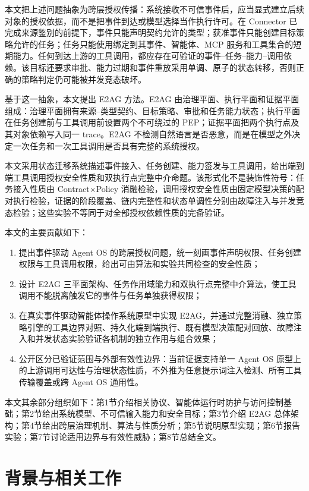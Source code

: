 本文把上述问题抽象为跨层授权传播：系统接收不可信事件后，应当显式建立后续对象的授权依据，而不是把事件到达或模型选择当作执行许可。在 Connector 已完成来源鉴别的前提下，事件只能声明契约允许的类型；获准事件只能创建目标策略允许的任务；任务只能使用绑定到其事件、智能体、MCP 服务和工具集合的短期能力。任何到达上游的工具调用，都应存在可验证的事件--任务--能力--调用依赖。该目标还要求审批、能力过期和事件重放采用单调、原子的状态转移，否则正确的策略判定仍可能被并发竞态破坏。

基于这一抽象，本文提出 E2AG 方法。E2AG 由治理平面、执行平面和证据平面组成：治理平面拥有来源--类型契约、目标策略、审批和任务能力状态；执行平面在任务创建前与工具调用前设置两个不可绕过的 PEP；证据平面把两个执行点及其对象依赖写入同一 trace。E2AG 不检测自然语言是否恶意，而是在模型之外决定一次任务和一次工具调用是否具有完整的系统授权。

本文采用状态迁移系统描述事件接入、任务创建、能力签发与工具调用，给出端到端工具调用授权安全性质和双执行点完整中介命题。该形式化不是装饰性符号：任务接入性质由 Contract$\times$Policy 消融检验，调用授权安全性质由固定模型决策的配对执行检验，证据的阶段覆盖、链内完整性和状态单调性分别由故障注入与并发竞态检验；这些实验不等同于对全部授权依赖性质的完备验证。

本文的主要贡献如下：
\begin{enumerate}
  \item 提出事件驱动 Agent OS 的跨层授权问题，统一刻画事件声明权限、任务创建权限与工具调用权限，给出可由算法和实验共同检查的安全性质；
  \item 设计 E2AG 三平面架构、任务作用域能力和双执行点完整中介算法，使工具调用不能脱离触发它的事件与任务单独获得权限；
  \item 在真实事件驱动智能体操作系统原型中实现 E2AG，并通过完整消融、独立策略引擎的工具边界对照、持久化端到端执行、既有模型决策配对回放、故障注入和并发状态实验验证各机制的独立作用与组合效果；
  \item 公开区分已验证范围与外部有效性边界：当前证据支持单一 Agent OS 原型上的上游调用可达性与治理状态性质，不外推为任意提示词注入检测、所有工具传输覆盖或跨 Agent OS 通用性。
\end{enumerate}

本文其余部分组织如下：第1节介绍相关协议、智能体运行时防护与访问控制基础；第2节给出系统模型、不可信输入能力和安全目标；第3节介绍 E2AG 总体架构；第4节给出跨层治理机制、算法与性质分析；第5节说明原型实现；第6节报告实验；第7节讨论适用边界与有效性威胁；第8节总结全文。

\section{背景与相关工作}\label{sec:related-v11}


